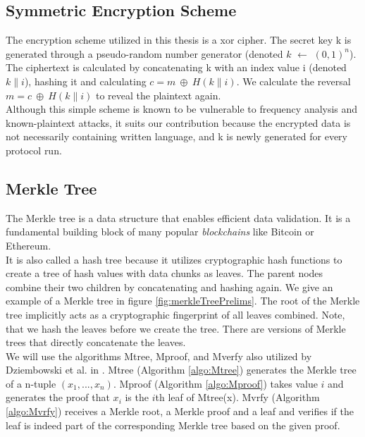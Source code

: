 \documentclass{cacthesis}
\newcounter{protocol}
\begin{document}
            \subsection{Symmetric Encryption Scheme}
            \label{sub:SymmetricEncryptionScheme}
	        The encryption scheme utilized in this thesis is a xor cipher. The secret key k is generated through a pseudo-random number generator (denoted $k$ $\leftarrow$ $(0, 1)^n$). The ciphertext is calculated by concatenating k with an index value i (denoted $k\|i$), hashing it and calculating  $c = m \ \oplus \ H(k\|i)$. We calculate the reversal $m = c \ \oplus \ H(k\|i)$ to reveal the plaintext again. \\
            Although this simple scheme is known to be vulnerable to frequency analysis and known-plaintext attacks, it suits our contribution because the encrypted data is not necessarily containing written language, and k is newly generated for every protocol run.

            \subsection{Merkle Tree}
            \label{sub:MerkleTree}
	        The Merkle tree is a data structure that enables efficient data validation. It is a fundamental building block of many popular \textit{blockchains} like Bitcoin or Ethereum. \\
            It is also called a hash tree because it utilizes cryptographic hash functions to create a tree of hash values with data chunks as leaves. The parent nodes combine their two children by concatenating and hashing again. We give an example of a Merkle tree in figure \ref{fig:merkleTreePrelims}. The root of the Merkle tree implicitly acts as a cryptographic fingerprint of all leaves combined. Note, that we hash the leaves before we create the tree. There are versions of Merkle trees that directly concatenate the leaves. \\
            We will use the algorithms \textsf{Mtree}, \textsf{Mproof}, and \textsf{Mverfy} also utilized by Dziembowski et al. in \cite{10.1145/3243734.3243857}. \textsf{Mtree} (Algorithm \ref{algo:Mtree}) generates the Merkle tree of a n-tuple $(x_1, ..., x_n)$. \textsf{Mproof} (Algorithm \ref{algo:Mproof}) takes value $i$ and generates the proof that $x_i$ is the $i$th leaf of \textsf{Mtree(x)}. \textsf{Mvrfy} (Algorithm \ref{algo:Mvrfy}) receives a Merkle root, a Merkle proof and a leaf and verifies if the leaf is indeed part of the corresponding Merkle tree based on the given proof.
            
\end{document}
